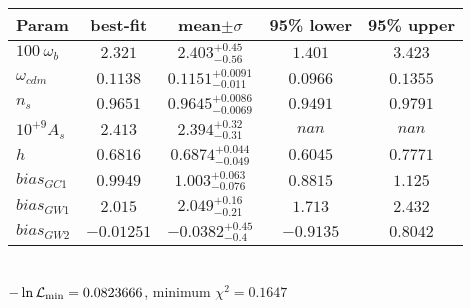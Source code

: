 \begin{tabular}{|l|c|c|c|c|} 
 \hline 
Param & best-fit & mean$\pm\sigma$ & 95\% lower & 95\% upper \\ \hline 
$100~\omega_{b }$ &$2.321$ & $2.403_{-0.56}^{+0.45}$ & $1.401$ & $3.423$ \\ 
$\omega_{cdm }$ &$0.1138$ & $0.1151_{-0.011}^{+0.0091}$ & $0.0966$ & $0.1355$ \\ 
$n_{s }$ &$0.9651$ & $0.9645_{-0.0069}^{+0.0086}$ & $0.9491$ & $0.9791$ \\ 
$10^{+9}A_{s }$ &$2.413$ & $2.394_{-0.31}^{+0.32}$ & $nan$ & $nan$ \\ 
$h$ &$0.6816$ & $0.6874_{-0.049}^{+0.044}$ & $0.6045$ & $0.7771$ \\ 
$bias_{GC 1 }$ &$0.9949$ & $1.003_{-0.076}^{+0.063}$ & $0.8815$ & $1.125$ \\ 
$bias_{GW 1 }$ &$2.015$ & $2.049_{-0.21}^{+0.16}$ & $1.713$ & $2.432$ \\ 
$bias_{GW 2 }$ &$-0.01251$ & $-0.0382_{-0.4}^{+0.45}$ & $-0.9135$ & $0.8042$ \\ 
\hline 
 \end{tabular} \\ 
$-\ln{\cal L}_\mathrm{min} =0.0823666$, minimum $\chi^2=0.1647$ \\ 
